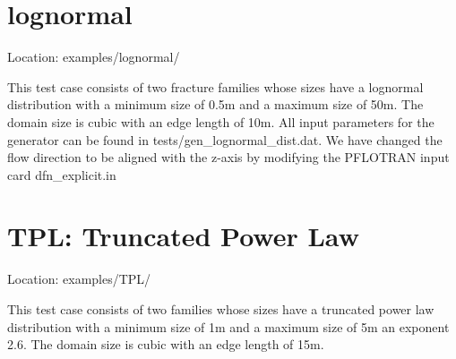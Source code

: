 \documentclass[letterpaper,10pt,english]{sphinxmanual}
\begin{document}
\section{lognormal}
\label{\detokenize{examples:lognormal}}
Location: examples/lognormal/

This test case consists of two fracture families whose sizes have a lognormal distribution with a minimum size of 0.5m and a maximum size of 50m. The domain size is cubic with an edge length of 10m. All input parameters for the generator can be found in tests/gen\_lognormal\_dist.dat. We have changed the flow direction to be aligned with the z-axis by modifying the PFLOTRAN input card dfn\_explicit.in

\begin{figure}[htbp]
\centering

\noindent{}
\end{figure}

\begin{DUlineblock}{0em}
\item[] 
\item[] 
\end{DUlineblock}

\begin{figure}[htbp]
\centering

\noindent{}
\end{figure}

\begin{DUlineblock}{0em}
\item[] 
\item[] 
\end{DUlineblock}


\section{TPL: Truncated Power Law}
\label{\detokenize{examples:tpl-truncated-power-law}}
Location: examples/TPL/

This test case consists of two families whose sizes have a truncated power law distribution with a minimum size of 1m and a maximum size of 5m an exponent 2.6. The domain size is cubic with an edge length of 15m.

\begin{figure}[htbp]
\centering

\noindent{}
\end{figure}
\end{document}
